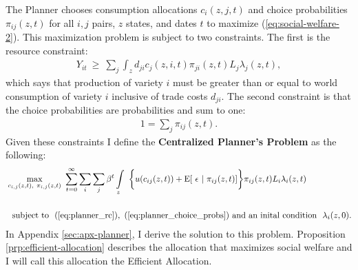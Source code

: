 \documentclass[12pt,pdftex]{article}
\begin{document}
\begin{onehalfspacing}
The Planner chooses consumption allocations $c_{i}(z, j, t)$ and choice probabilities $\pi_{ij}(z,t)$ for all $i,j$ pairs, $z$ states, and dates $t$ to maximize (\ref{eq:social-welfare-2}). This maximization problem is subject to two constraints. The first is the resource constraint:
\begin{align}
Y_{it} \  \geq \ \sum_{j} \int_{z} d_{ji} c_{j}(z, i, t) \pi_{ji}(z,t) L_{j}\lambda_{j}(z, t),
\label{eq:planner_rc}
\end{align}
which says that production of variety $i$ must be greater than or equal to world consumption of variety $i$ inclusive of trade costs $d_{ji}$. The second constraint is that the choice probabilities are probabilities and sum to one:
\begin{align}
1 = \sum_{j}\pi_{ij}(z,t).
\label{eq:planner_choice_probs}
\end{align}
Given these constraints I define the \textbf{Centralized Planner's Problem} as the following:
\begin{align}
&\max\limits_{c_{i,j}(z, t),\ \pi_{i,j}(z, t)} \ \sum_{t=0}^{\infty}  \sum_{i} \sum_{j} \beta^{t} \int\limits_{z}   \  \bigg \{  u(c_{ij}(z, t) ) + \mathrm{E}[ \ \epsilon \ | \ \pi_{ij}(z,t) ] \bigg \}\pi_{ij}(z,t) L_{i} \lambda_{i}(z, t) \ \ \label{eq:planner_problem}\\
\nonumber \\
& \ \ \mbox{subject to} \ \ (\ref{eq:planner_rc}), \ (\ref{eq:planner_choice_probs}) \ \mbox{and an inital condition} \ \ \lambda_i(z, 0).
\end{align}
In Appendix \ref{sec:apx-planner}, I derive the solution to this problem. Proposition \ref{prp:efficient-allocation} describes the allocation that maximizes social welfare and I will call this allocation the Efficient Allocation.


\end{onehalfspacing}
\end{document}

